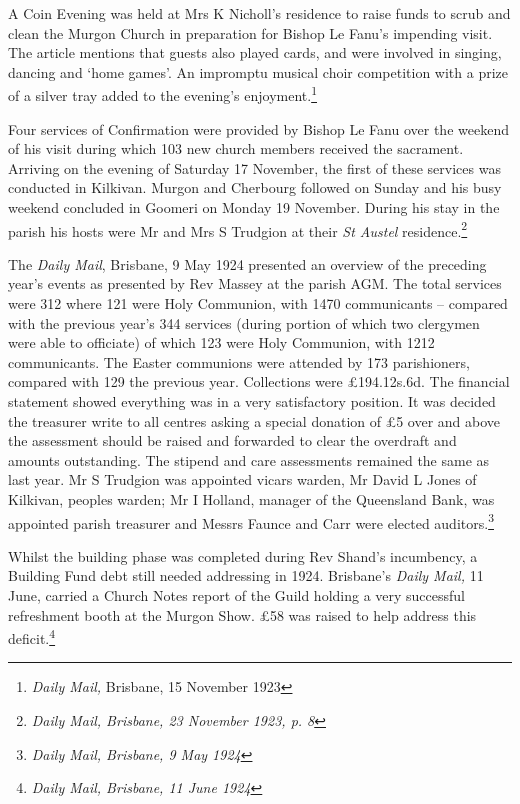 A Coin Evening was held at Mrs K Nicholl's residence to raise funds to scrub and clean the Murgon Church in preparation for Bishop Le Fanu's impending visit. The article mentions that guests also played cards, and were involved in singing, dancing and `home games'. An impromptu musical choir competition with a prize of a silver tray added to the evening's enjoyment.\footnote{\emph{Daily Mail,} Brisbane, 15 November 1923}

Four services of Confirmation were provided by Bishop Le Fanu over the weekend of his visit during which 103 new church members received the sacrament. Arriving on the evening of Saturday 17 November, the first of these services was conducted in Kilkivan. Murgon and Cherbourg followed on Sunday and his busy weekend concluded in Goomeri on Monday 19 November. During his stay in the parish his hosts were Mr and Mrs S Trudgion at their \emph{St Austel} residence.\footnote{\emph{Daily Mail, Brisbane, 23 November 1923, p. 8}}

The \emph{Daily Mail}, Brisbane, 9 May 1924 presented an overview of the preceding year's events as presented by Rev Massey at the parish AGM. The total services were 312 where 121 were Holy Communion, with 1470 communicants -- compared with the previous year's 344 services (during portion of which two clergymen were able to officiate) of which 123 were Holy Communion, with 1212 communicants. The Easter communions were attended by 173 parishioners, compared with 129 the previous year. Collections were £194.12s.6d. The financial statement showed everything was in a very satisfactory position. It was decided the treasurer write to all centres asking a special donation of £5 over and above the assessment should be raised and forwarded to clear the overdraft and amounts outstanding. The stipend and care assessments remained the same as last year. Mr S Trudgion was appointed vicars warden, Mr David L Jones of Kilkivan, peoples warden; Mr I Holland, manager of the Queensland Bank, was appointed parish treasurer and Messrs Faunce and Carr were elected auditors.\footnote{\emph{Daily Mail, Brisbane, 9 May 1924}}

Whilst the building phase was completed during Rev Shand's incumbency, a Building Fund debt still needed addressing in 1924. Brisbane's \emph{Daily Mail,} 11 June, carried a Church Notes report of the Guild holding a very successful refreshment booth at the Murgon Show. £58 was raised to help address this deficit.\footnote{\emph{Daily Mail, Brisbane, 11 June 1924}}

